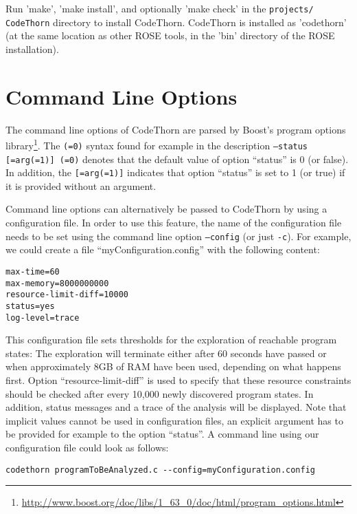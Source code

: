 \documentclass[natbib]{article}
\newcommand{\enquote}[1]{``#1''}
\begin{document}
Run 'make', 'make install', and optionally 'make check' in the
\verb+projects/+ \verb+CodeThorn+ directory to install CodeThorn. CodeThorn is
installed as 'codethorn' (at the same location as other ROSE tools, in
the 'bin' directory of the ROSE installation).

\section{Command Line Options}
The command line options of CodeThorn are parsed by Boost's program options 
library\footnote{\url{http://www.boost.org/doc/libs/1_63_0/doc/html/program_options.html}}.
The \texttt{(=0)} syntax found for example in the description \texttt{--status [=arg(=1)] (=0)} 
denotes that the default value of option \enquote{status} is 0 (or false).
In addition, the \texttt{[=arg(=1)]} indicates that option \enquote{status} is set to 1 (or true) 
if it is provided without an argument.

Command line options can alternatively be passed to CodeThorn by using a configuration file.
In order to use this feature, the name of the configuration file needs to be set using the 
command line option \texttt{--config} (or just \texttt{-c}). For example, we could create a file
\enquote{myConfiguration.config} with the following content:
\begin{verbatim}
max-time=60
max-memory=8000000000
resource-limit-diff=10000
status=yes
log-level=trace
\end{verbatim}

This configuration file sets thresholds for the exploration of reachable program states: 
The exploration will terminate either after 60 seconds have passed or when approximately 8GB of RAM have been used,
depending on what happens first. Option \enquote{resource-limit-diff} is used to specify that these
resource constraints should be checked after every 10,000 newly discovered program states. 
In addition, status messages and a trace of the
analysis will be displayed. Note that implicit values cannot be used in configuration files,
an explicit argument has to be provided for example to the option \enquote{status}.
A command line using our configuration file could look as follows:
\begin{verbatim}
codethorn programToBeAnalyzed.c --config=myConfiguration.config
\end{verbatim}
\end{document}
